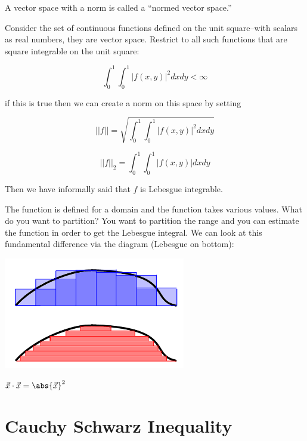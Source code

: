 \documentclass{scrreprt}
\begin{document}
A vector space with a norm is called a ``normed vector space.''

\begin{example}
	Consider the set of continuous functions defined on the unit square--with scalars
	as real numbers, they are vector space. Restrict to all such functions that are
	square integrable on the unit square:

	\[
		\int_0^1\int_0^1|f(x,y)|^2dx dy < \infty
	\]

	if this is true then we can create a norm on this space by setting

	\[
		||f|| = \sqrt{\int_0^1\int_0^1|f(x,y)|^2dxdy}
	\]

	\[
		||f||_2 = \int_0^1\int_0^1|f(x,y)|dxdy
	\]

	Then we have informally said that $f$ is Lebesgue integrable.
\end{example}

\begin{remark}
	The function is defined for a domain and the function takes various values. What do you want to
	partition? You want to partition the range and you can estimate the function in order to get the
	Lebesgue integral. We can look at this fundamental difference via the diagram (Lebesgue on bottom):

	\includegraphics[width=300px]{figures/2022-08-25-11-47-29.png}
\end{remark}

\begin{fact}
	$\vec{x}\cdot \vec{x} = \abs{\vec{x}}^2$
\end{fact}

\section{Cauchy Schwarz Inequality}
\end{document}
